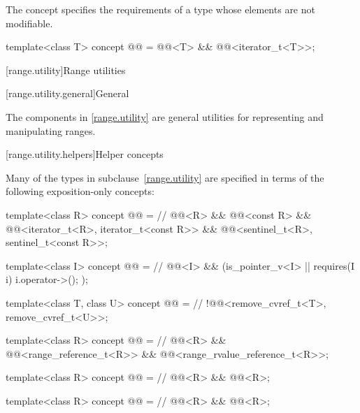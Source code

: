 \pnum
The  concept specifies the requirements of a
 type whose elements are not modifiable.

\begin{itemdecl}
template<class T>
  concept @@ =
    @@<T> && @@<iterator_t<T>>;
\end{itemdecl}

[range.utility]{Range utilities}

[range.utility.general]{General}

\pnum
The components in \ref{range.utility} are general utilities for representing and
manipulating ranges.

[range.utility.helpers]{Helper concepts}

\pnum
Many of the types in subclause~\ref{range.utility} are specified in terms of
the following exposition-only concepts:

\begin{codeblock}
template<class R>
  concept @@ =                                     // \expos
    @@<R> && @@<const R> &&
    @@<iterator_t<R>, iterator_t<const R>> &&
    @@<sentinel_t<R>, sentinel_t<const R>>;

template<class I>
  concept @@ =                                       // \expos
    @@<I> && (is_pointer_v<I> || requires(I i) { i.operator->(); });

template<class T, class U>
  concept @@ =                                  // \expos
    !@@<remove_cvref_t<T>, remove_cvref_t<U>>;

template<class R>
  concept @@ =                   // \expos
    @@<R> && @@<range_reference_t<R>> &&
    @@<range_rvalue_reference_t<R>>;

template<class R>
  concept @@ =                           // \expos
    @@<R> && @@<R>;

template<class R>
  concept @@ =                            // \expos
    @@<R> && @@<R>;
\end{codeblock}

